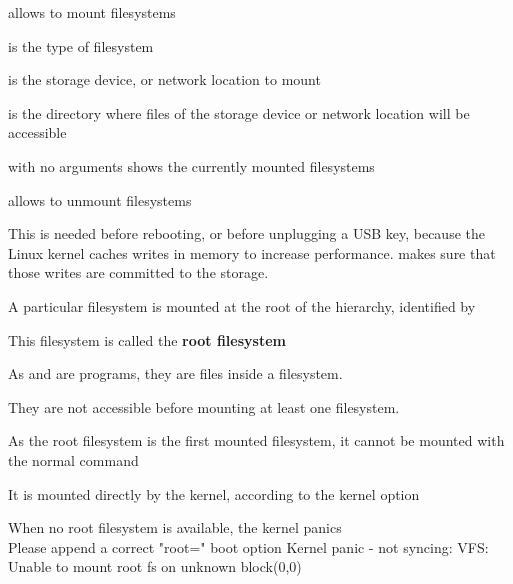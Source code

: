   \startitemize
  \item {} allows to mount filesystems
    \startitemize
    \item {}
    \item {} is the type of filesystem
    \item {} is the storage device, or network location to
      mount
    \item {} is the directory where files of the
      storage device or network location will be accessible
    \item {} with no arguments shows the currently mounted
      filesystems
    \stopitemize
  \item {} allows to unmount filesystems
    \startitemize
    \item This is needed before rebooting, or before unplugging a USB
      key, because the Linux kernel caches writes in memory to
      increase performance.  makes sure that those writes are
      committed to the storage.
    \stopitemize
  \stopitemize

  \startitemize
  \item A particular filesystem is mounted at the root of the hierarchy,
    identified by \type{/}
  \item This filesystem is called the {\bf root filesystem}
  \item As  and  are programs, they are files
    inside a filesystem.
    \startitemize
    \item They are not accessible before mounting at least one filesystem.
    \stopitemize
  \item As the root filesystem is the first mounted filesystem, it
    cannot be mounted with the normal  command
  \item It is mounted directly by the kernel, according to the
     kernel option
  \item When no root filesystem is available, the kernel panics\\
\starttyping
Please append a correct "root=" boot option
Kernel panic - not syncing: VFS: Unable to mount root fs on unknown block(0,0)
\stoptyping
  \stopitemize

